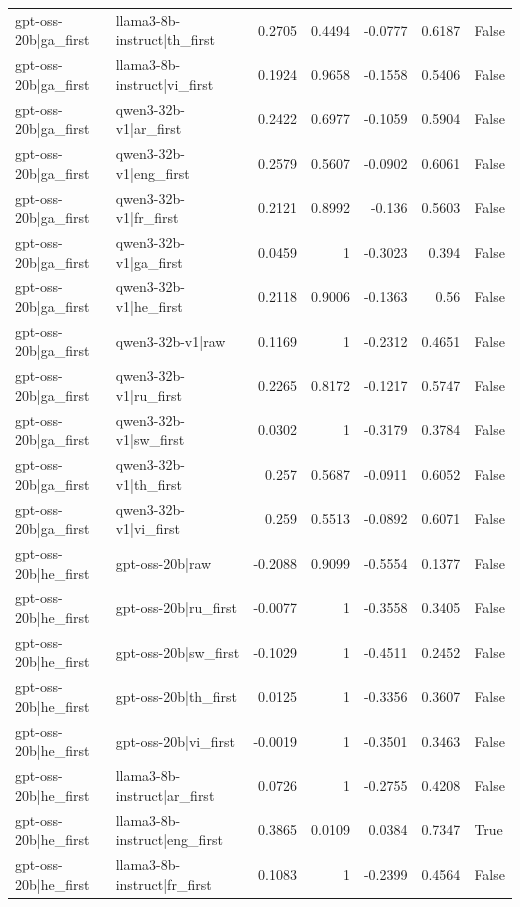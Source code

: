 \begin{table}
\begin{tabular}{l l r r r r l}
gpt-oss-20b|ga_first & llama3-8b-instruct|th_first & 0.2705 & 0.4494 & -0.0777 & 0.6187 & False \\
gpt-oss-20b|ga_first & llama3-8b-instruct|vi_first & 0.1924 & 0.9658 & -0.1558 & 0.5406 & False \\
gpt-oss-20b|ga_first & qwen3-32b-v1|ar_first & 0.2422 & 0.6977 & -0.1059 & 0.5904 & False \\
gpt-oss-20b|ga_first & qwen3-32b-v1|eng_first & 0.2579 & 0.5607 & -0.0902 & 0.6061 & False \\
gpt-oss-20b|ga_first & qwen3-32b-v1|fr_first & 0.2121 & 0.8992 & -0.136 & 0.5603 & False \\
gpt-oss-20b|ga_first & qwen3-32b-v1|ga_first & 0.0459 & 1 & -0.3023 & 0.394 & False \\
gpt-oss-20b|ga_first & qwen3-32b-v1|he_first & 0.2118 & 0.9006 & -0.1363 & 0.56 & False \\
gpt-oss-20b|ga_first & qwen3-32b-v1|raw & 0.1169 & 1 & -0.2312 & 0.4651 & False \\
gpt-oss-20b|ga_first & qwen3-32b-v1|ru_first & 0.2265 & 0.8172 & -0.1217 & 0.5747 & False \\
gpt-oss-20b|ga_first & qwen3-32b-v1|sw_first & 0.0302 & 1 & -0.3179 & 0.3784 & False \\
gpt-oss-20b|ga_first & qwen3-32b-v1|th_first & 0.257 & 0.5687 & -0.0911 & 0.6052 & False \\
gpt-oss-20b|ga_first & qwen3-32b-v1|vi_first & 0.259 & 0.5513 & -0.0892 & 0.6071 & False \\
gpt-oss-20b|he_first & gpt-oss-20b|raw & -0.2088 & 0.9099 & -0.5554 & 0.1377 & False \\
gpt-oss-20b|he_first & gpt-oss-20b|ru_first & -0.0077 & 1 & -0.3558 & 0.3405 & False \\
gpt-oss-20b|he_first & gpt-oss-20b|sw_first & -0.1029 & 1 & -0.4511 & 0.2452 & False \\
gpt-oss-20b|he_first & gpt-oss-20b|th_first & 0.0125 & 1 & -0.3356 & 0.3607 & False \\
gpt-oss-20b|he_first & gpt-oss-20b|vi_first & -0.0019 & 1 & -0.3501 & 0.3463 & False \\
gpt-oss-20b|he_first & llama3-8b-instruct|ar_first & 0.0726 & 1 & -0.2755 & 0.4208 & False \\
gpt-oss-20b|he_first & llama3-8b-instruct|eng_first & 0.3865 & 0.0109 & 0.0384 & 0.7347 & True \\
gpt-oss-20b|he_first & llama3-8b-instruct|fr_first & 0.1083 & 1 & -0.2399 & 0.4564 & False \\

\end{tabular}
\end{table}
